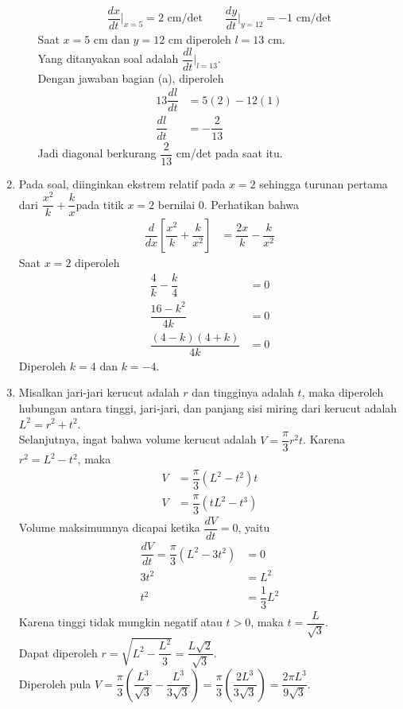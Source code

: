 \documentclass{article}
\begin{document}
\begin{enumerate}
\begin{enumerate}
\begin{align*}
	\dfrac{dx}{dt}\bigg|_{x=5} = 2 \text{ cm/det} \qquad \dfrac{dy}{dt}\bigg|_{y=12} = -1 \text{ cm/det}
	\end{align*}
	Saat $x=5$ cm dan $y=12$ cm diperoleh $l=13$ cm.\\
	Yang ditanyakan soal adalah $\dfrac{dl}{dt}\bigg|_{l=13}$. \\
	Dengan jawaban bagian (a), diperoleh 
	\begin{align*}
	13\dfrac{dl}{dt} &= 5(2)-12(1)\\
	\dfrac{dl}{dt} &= -\dfrac{2}{13}
	\end{align*}
	Jadi diagonal berkurang $\dfrac{2}{13}$ cm/det pada saat itu.
	\end{enumerate}
	\item Pada soal, diinginkan ekstrem relatif pada $x=2$ sehingga turunan pertama dari $\dfrac{x^2}{k}+\dfrac{k}{x} $pada titik $x=2$ bernilai 0. Perhatikan bahwa 
	\begin{align*}
	\dfrac{d}{dx}\left[\dfrac{x^2}{k}+\dfrac{k}{x^2}\right] &= \dfrac{2x}{k}-\dfrac{k}{x^2}
	\end{align*}
	Saat $x=2$ diperoleh 
	\begin{align*}
	\dfrac{4}{k}-\dfrac{k}{4} &= 0\\
	\dfrac{16-k^2}{4k} &= 0\\
	\dfrac{(4-k)(4+k)}{4k} &= 0
	\end{align*}
	Diperoleh $k=4$ dan $k=-4$.
	\item Misalkan jari-jari kerucut adalah $r$ dan tingginya adalah $t$, maka diperoleh hubungan antara tinggi, jari-jari, dan panjang sisi miring dari kerucut adalah $L^2=r^2+t^2$. \\
	Selanjutnya, ingat bahwa volume kerucut adalah $V=\dfrac{\pi}{3}r^2t$. Karena $r^2=L^2-t^2$, maka 
	\begin{align*}
	V&=\dfrac{\pi}{3}(L^2-t^2)t\\
	V&=\dfrac{\pi}{3}(tL^2-t^3)
	\end{align*}
	Volume maksimumnya dicapai ketika $\dfrac{dV}{dt} =0$, yaitu 
	\begin{align*}
	\dfrac{dV}{dt} = \dfrac{\pi}{3}(L^2-3t^2) &= 0\\
	3t^2 &= L^2\\
	t^2 &= \dfrac{1}{3}L^2
	\end{align*}
	Karena tinggi tidak mungkin negatif atau $t>0$, maka $t=\dfrac{L}{\sqrt{3}}$.\\ 
	Dapat diperoleh $r=\sqrt{L^2-\dfrac{L^2}{3}} = \dfrac{L\sqrt{2}}{\sqrt{3}}$.\\
	Diperoleh pula $V=\dfrac{\pi}{3}\left(\dfrac{L^3}{\sqrt{3}}-\dfrac{L^3}{3\sqrt{3}}\right) = \dfrac{\pi}{3}\left(\dfrac{2L^3}{3\sqrt{3}}\right)=\dfrac{2\pi L^3}{9\sqrt{3}}$.
\end{enumerate}
\end{document}
